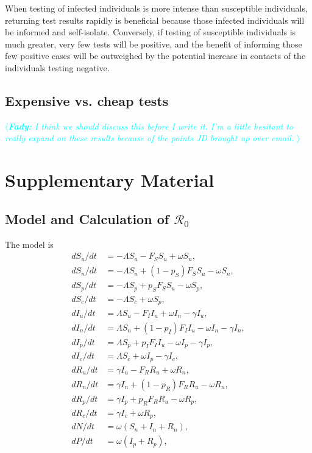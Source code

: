 \documentclass[12pt]{article}
\newcommand{\fady}[1]{\textcolor{cyan}{$\langle${\slshape{\bfseries Fady:} #1 }$\rangle$}}
\newcommand{\Rnum}{\mathcal{R}_0}
\theoremstyle{definition} %
\begin{document}
When testing of infected individuals is more intense than susceptible individuals, returning test results rapidly is beneficial because those infected individuals will be informed and self-isolate. Conversely, if testing of susceptible individuals is much greater, very few tests will be positive, and the benefit of informing those few positive cases will be outweighed by the potential increase in contacts of the individuals testing negative. 


\subsection{Expensive vs. cheap tests}
\fady{I think we should discuss this before I write it. I'm a little hesitant to really expand on these results because of the points JD brought up over email.}




\section{Supplementary Material}

\subsection{Model and Calculation of $\Rnum$}

The model is 
\begin{align}
 d S_u/dt &= -\Lambda S_u - F_S S_u + \omega S_n, \label{eq1}\\
 d S_n/dt &= -\Lambda S_n + (1-p_S) F_S S_u - \omega S_n, \label{eq2}\\
 d S_p/dt &= -\Lambda S_p + p_S F_S S_u - \omega S_p, \label{eq3}\\
 d S_c/dt &= -\Lambda S_c + \omega S_p, \label{eq4}\\
 d I_u/dt &= \Lambda S_u - F_I I_u + \omega I_n  - \gamma I_u,  \label{eq5}\\
 d I_n/dt &= \Lambda S_n + (1-p_I) F_I I_u - \omega I_n -\gamma I_n, \label{eq6}\\
 d I_p/dt &= \Lambda S_p + p_I F_I I_u - \omega I_p -\gamma I_p, \label{eq7}\\
 d I_c/dt &= \Lambda S_c + \omega I_p - \gamma I_c,  \label{eq8}\\
 d R_u/dt &= \gamma I_u - F_R R_u + \omega R_n, \label{eq9}\\
 d R_n/dt &= \gamma I_n + (1-p_R) F_R R_u - \omega R_n,  \label{eq10}\\
 d R_p/dt &= \gamma I_p + p_R F_R R_u  - \omega R_p,  \label{eq11}\\
 d R_c/dt&= \gamma I_c + \omega R_p,  \label{eq12}\\
 dN/dt &= \omega (S_n + I_n + R_n),   \label{eq13}\\
 dP/dt &= \omega(I_p + R_p) \label{eq14},
\end{align}
\end{document}
